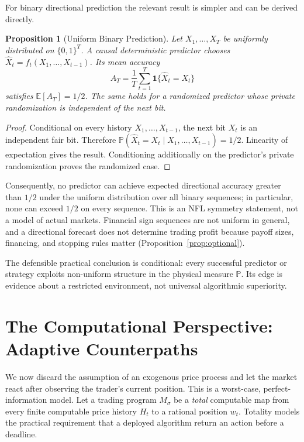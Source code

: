 \documentclass[aps,pra,reprint,superscriptaddress,amsmath,amssymb,floatfix]{revtex4-2}
\theoremstyle{plain}
\newtheorem{proposition}[theorem]{Proposition}
\theoremstyle{definition}
\theoremstyle{remark}
\begin{document}
For binary directional prediction the relevant result is simpler and can be
derived directly.

\begin{proposition}[Uniform Binary Prediction]
  \label{prop:binary}
  Let \(X_1,\ldots,X_T\) be uniformly distributed on \(\{0,1\}^T\). A causal
  deterministic predictor chooses
  \(\widehat X_t=f_t(X_1,\ldots,X_{t-1})\). Its mean accuracy
  \[
    A_T=\frac1T\sum_{t=1}^T
      \mathbf{1}\{\widehat X_t=X_t\}
  \]
  satisfies \(\mathbb{E}[A_T]=1/2\). The same holds for a randomized predictor
  whose private randomization is independent of the next bit.
\end{proposition}

\begin{proof}
Conditional on every history \(X_1,\ldots,X_{t-1}\), the next bit \(X_t\) is
an independent fair bit. Therefore
\(\mathbb{P}(\widehat X_t=X_t\mid X_1,\ldots,X_{t-1})=1/2\).
Linearity of expectation gives the result. Conditioning additionally on the
predictor's private randomization proves the randomized case.
\end{proof}

Consequently, no predictor can achieve expected directional accuracy greater
than \(1/2\) under the uniform distribution over all binary sequences; in
particular, none can exceed \(1/2\) on every sequence. This is an NFL symmetry
statement, not a model of actual markets. Financial sign sequences are not
uniform in general, and a directional forecast does not determine trading
profit because payoff sizes, financing, and stopping rules matter
(Proposition~\ref{prop:optional}).

The defensible practical conclusion is conditional: every successful
predictor or strategy exploits non-uniform structure in the physical measure
\(\mathbb{P}\). Its edge is evidence about a restricted environment, not
universal algorithmic superiority.

\section{The Computational Perspective: Adaptive Counterpaths}
\label{sec:computability}

We now discard the assumption of an exogenous price process and let the market
react after observing the trader's current position. This is a worst-case,
perfect-information model. Let a trading program \(M_\sigma\) be a
\emph{total} computable map from every finite computable price history \(H_t\)
to a rational position \(w_t\). Totality models the practical requirement that
a deployed algorithm return an action before a deadline.
\end{document}
